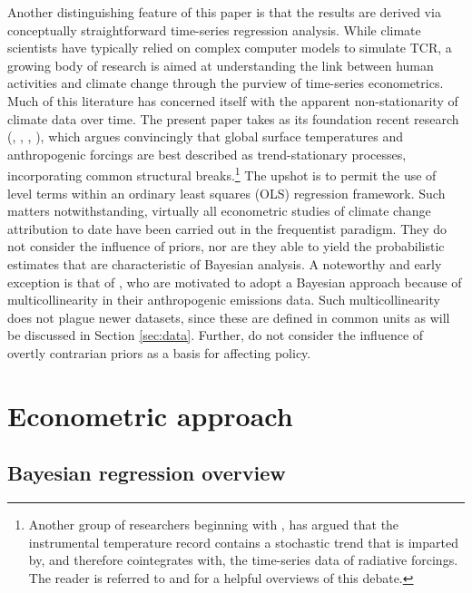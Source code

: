 \documentclass[smallextended]{svjour3}       %
\begin{document}
Another distinguishing feature of this paper is that the results are
derived via conceptually straightforward time-series regression
analysis. While climate scientists have typically relied on complex
computer models to simulate TCR, a growing body of research is aimed at
understanding the link between human activities and climate change
through the purview of time-series econometrics. Much of this literature
has concerned itself with the apparent non-stationarity of climate data
over time. The present paper takes as its foundation recent research
(\cite{gay2009global}, \cite{estrada2013statistically},
\cite{estrada2013time}, \cite{kim2020inference}), which argues
convincingly that global surface temperatures and anthropogenic forcings
are best described as trend-stationary processes, incorporating common
structural breaks.\footnote{Another group of researchers beginning with
  \cite{stern2000detecting}, has argued that the instrumental
  temperature record contains a stochastic trend that is imparted by,
  and therefore cointegrates with, the time-series data of radiative
  forcings. The reader is referred to \cite{estrada2013detection} and
  \cite{hillebrand2020econometric} for a helpful overviews of this
  debate.} The upshot is to permit the use of level terms within an
ordinary least squares (OLS) regression framework. Such matters
notwithstanding, virtually all econometric studies of climate change
attribution to date have been carried out in the frequentist paradigm.
They do not consider the influence of priors, nor are they able to yield
the probabilistic estimates that are characteristic of Bayesian
analysis. A noteworthy and early exception is that of
\cite{tol1998bayes}, who are motivated to adopt a Bayesian approach
because of multicollinearity in their anthropogenic emissions data. Such
multicollinearity does not plague newer datasets, since these are
defined in common units as will be discussed in Section \ref{sec:data}.
Further, \cite{tol1998bayes} do not consider the influence of overtly
contrarian priors as a basis for affecting policy.

\hypertarget{sec:econometric}{%
\section{Econometric approach}\label{sec:econometric}}

\hypertarget{sec:bayesian}{%
\subsection{Bayesian regression overview}\label{sec:bayesian}}
\end{document}
